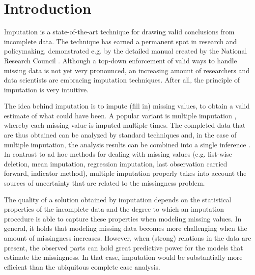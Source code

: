 \documentclass[bimj,fleqn]{w-art}
\begin{document}






\section{Introduction}

Imputation is a state-of-the-art technique for drawing valid conclusions from incomplete data. The technique has earned a permanent spot in research and policymaking, demonstrated e.g. by the detailed manual created by the National Research Council \citep*{little2012prevention}. Although a top-down enforcement of valid ways to handle missing data is not yet very pronounced, an increasing amount of researchers and data scientists are embracing imputation techniques. After all, the principle of imputation is very intuitive.

The idea behind imputation is to impute (fill in) missing values, to obtain a valid estimate of what could have been. A popular variant is multiple imputation \citep{rubi76}, whereby each missing value is imputed multiple times. The completed data that are thus obtained can be analyzed by standard techniques and, in the case of multiple imputation, the analysis results can be combined into a single inference \citep[using Rubin's rules][]{rubi87}. In contrast to ad hoc methods for dealing with missing values (e.g. list-wise deletion, mean imputation, regression imputation, last observation carried forward, indicator method), multiple imputation properly takes into account the sources of uncertainty that are related to the missingness problem. 

The quality of a solution obtained by imputation depends on the statistical properties of the incomplete data and the degree to which an imputation procedure is able to capture these properties when modeling missing values. In general, it holds that modeling missing data becomes more challenging when the amount of missingness increases. However, when (strong) relations in the data are present, the observed parts can hold great predictive power for the models that estimate the missingness. In that case, imputation would be substantially more efficient than the ubiquitous complete case analysis.
\end{document}
